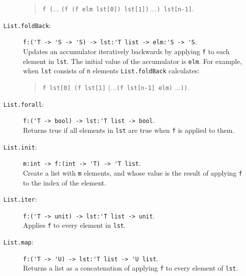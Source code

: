 \documentclass[fsharpNotes.tex]{subfiles}
\begin{document}
\begin{description}
\begin{quote}
    \lstinline{f (}$\ldots$ \lstinline{(f (f elm lst[0]) lst[1])} $\ldots$\lstinline{) lst[n-1]}.
  \end{quote}
\item[\texttt{List.foldBack}:] \lstinline{f:('T -> 'S -> 'S) -> lst:'T list -> elm:'S -> 'S}.~\\
  Updates an accumulator iteratively backwards by applying \lstinline{f} to each element in \lstinline{lst}. The initial value of the accumulator is \lstinline{elm}. For example, when \lstinline{lst} consists of \lstinline{n} elements
  \lstinline{List.foldBack} calculates:
  \begin{quote}
    \lstinline{f lst[0] (f lst[1]} ($\ldots$\lstinline{(f lst[n-1] elm)} $\ldots$\lstinline{))}.
  \end{quote}
\item[\texttt{List.forall}:] \lstinline{f:('T -> bool) -> lst:'T list -> bool}.~\\
  Returns true if all elements in \lstinline{lst} are true when \lstinline{f} is applied to them.
\item[\texttt{List.init}:] \lstinline{m:int -> f:(int -> 'T) -> 'T list}.~\\
  Create a list with \lstinline{m} elements, and whose value is the result of applying \lstinline{f} to the index of the element.
\item[\texttt{List.iter}:] \lstinline{f:('T -> unit) -> lst:'T list -> unit}.~\\
  Applies \lstinline{f} to every element in \lstinline{lst}.
\item[\texttt{List.map}:] \lstinline{f:('T -> 'U) -> lst:'T list -> 'U list}.~\\
  Returns a list as a concatenation of applying \lstinline{f} to every element of \lstinline{lst}.
\end{description}
\end{document}
